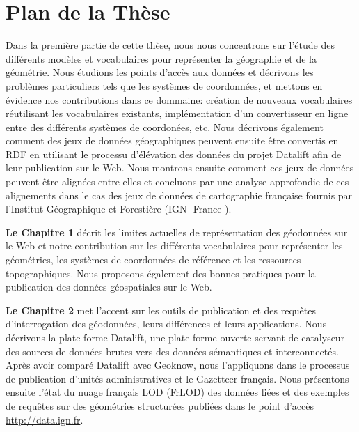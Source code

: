 \section*{Plan de la Th\`{e}se}
\label{sec:thesis-structure}
Dans la premi\`{e}re partie de cette th\`{e}se, nous nous concentrons sur l'\'{e}tude des diff\'{e}rents mod\`{e}les et vocabulaires pour repr\'{e}senter la g\'{e}ographie et de la g\'{e}om\'{e}trie. Nous \'{e}tudions les points d'acc\`{e}s aux donn\'{e}es et d\'{e}crivons les probl\`{e}mes particuliers tels que les syst\`{e}mes de coordonn\'{e}es, et mettons en \'{e}vidence nos contributions dans ce dommaine: cr\'{e}ation de nouveaux vocabulaires r\'{e}utilisant les vocabulaires existants, impl\'{e}mentation d'un convertisseur en ligne entre des diff\'{e}rents syst\`{e}mes de coordon\'{e}es, etc. Nous d\'{e}crivons \'{e}galement comment des jeux de donn\'{e}es g\'{e}ographiques peuvent ensuite \^{e}tre convertis en RDF en utilisant le processu d'\'{e}l\'{e}vation des donn\'{e}es du projet Datalift afin de leur publication sur le Web. Nous montrons ensuite comment ces jeux de donn\'{e}es peuvent \^{e}tre align\'{e}es entre elles et concluons par une analyse approfondie de ces alignements dans le cas des jeux de donn\'{e}es de cartographie fran\c{c}aise fournis par l'Institut G\'{e}ographique et Foresti\`{e}re (IGN -France ).

\textbf{Le Chapitre 1} d\'{e}crit les limites actuelles de repr\'{e}sentation des g\'{e}odonn\'{e}es sur le Web et notre contribution sur les diff\'{e}rents vocabulaires pour repr\'{e}senter les g\'{e}om\'{e}tries, les syst\`{e}mes de coordonn\'{e}es de r\'{e}f\'{e}rence et les ressources topographiques. Nous proposons \'{e}galement des bonnes pratiques pour la publication des donn\'{e}es g\'{e}ospatiales sur le Web.

\textbf{Le Chapitre 2} met l'accent sur les outils de publication et des requ\^{e}tes d'interrogation des g\'{e}odonn\'{e}es, leurs diff\'{e}rences et leurs applications. Nous d\'{e}crivons la plate-forme Datalift, une plate-forme ouverte servant de catalyseur des sources de donn\'{e}es brutes vers des donn\'{e}es s\'{e}mantiques et interconnect\'{e}s. Apr\`{e}s avoir compar\'{e} Datalift avec Geoknow, nous l'appliquons dans le processus de publication d'unit\'{e}s administratives et le Gazetteer fran\c{c}ais. Nous pr\'{e}sentons ensuite l'\'{e}tat du nuage fran\c{c}ais LOD (FrLOD) des donn\'{e}es li\'{e}es et des exemples de requ\^{e}tes sur des g\'{e}om\'{e}tries structur\'{e}es publi\'{e}es dans le point d'acc\`{e}s \url{http://data.ign.fr}.

